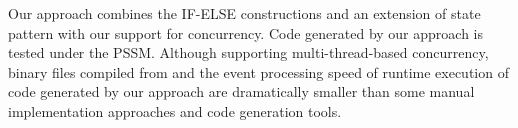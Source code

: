 Our approach combines the IF-ELSE constructions and an extension of state pattern \cite{niaz_mapping_2004} with our support for concurrency. 
Code generated by our approach is tested under the PSSM.
Although supporting multi-thread-based concurrency, binary files compiled from and the event processing speed of runtime execution of code generated by our approach are dramatically smaller than some manual implementation approaches and code generation tools.
  


